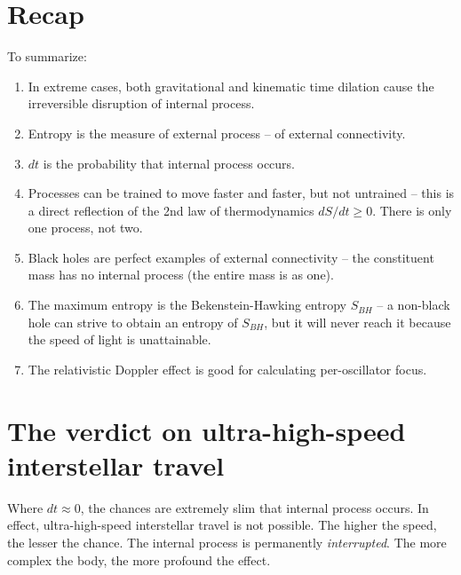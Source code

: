 \documentclass[12pt]{article}
\begin{document}
\section{Recap}

To summarize:
\begin{enumerate}
\item In extreme cases, both gravitational and kinematic time dilation cause the irreversible disruption of internal process.
\item Entropy is the measure of external process -- of external connectivity.
\item $dt$ is the probability that internal process occurs.
\item Processes can be trained to move faster and faster, but not untrained -- this is a direct reflection of the 2nd law of thermodynamics $dS/dt \geq 0$. There is only one process, not two.
\item Black holes are perfect examples of external connectivity -- the constituent mass has no internal process (the entire mass is as one).
\item The maximum entropy is the Bekenstein-Hawking entropy $S_{BH}$ -- a non-black hole can strive to obtain an entropy of $S_{BH}$, but it will never reach it because the speed of light is unattainable.
\item The relativistic Doppler effect is good for calculating per-oscillator focus.
\end{enumerate}




\section{The verdict on ultra-high-speed interstellar travel}


Where $dt \approx 0$, the chances are extremely slim that internal process occurs.
In effect, ultra-high-speed interstellar travel is not possible.
The higher the speed, the lesser the chance.
The internal process is permanently \textit{interrupted}.
The more complex the body, the more profound the effect.
\end{document}

